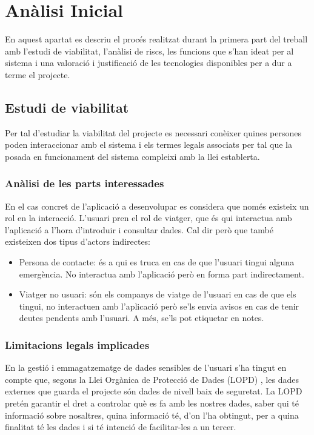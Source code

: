 
\chapter{Anàlisi Inicial} %

\label{AnalisiInicial} %

En aquest apartat es descriu el procés realitzat durant la primera part del treball amb l’estudi de viabilitat, l’anàlisi de riscs, les funcions que s’han ideat per al sistema i una valoració i justificació de les tecnologies disponibles per a dur a terme el projecte.

\section{Estudi de viabilitat}
Per tal d’estudiar la viabilitat del projecte es necessari conèixer quines persones poden interaccionar amb el sistema i els termes legals associats per tal que la posada en funcionament del sistema compleixi amb la llei establerta.

\subsection{Anàlisi de les parts interessades}
En el cas concret de l’aplicació a desenvolupar es considera que només existeix
un rol en la interacció. L’usuari pren el rol de viatger, que és qui interactua
amb l’aplicació a l’hora d’introduir i consultar dades. Cal dir però que també
existeixen dos tipus d’actors indirectes:

\begin{itemize}
\item{}Persona de contacte: és a qui es truca en cas de que l’usuari tingui alguna emergència. No interactua amb l’aplicació però en forma part indirectament.
\item{}Viatger no usuari: són els companys de viatge de l’usuari en cas de que els tingui, no interactuen amb l’aplicació però se’ls envia avisos en cas de tenir deutes pendents amb l’usuari. A més, se’ls pot etiquetar en notes.
\end{itemize}

\subsection{Limitacions legals implicades}
En la gestió i emmagatzematge de dades sensibles de l’usuari s’ha tingut en
compte que, segons la Llei Orgànica de Protecció de Dades (LOPD) , les dades externes que guarda el projecte són dades de nivell baix de seguretat. La LOPD pretén garantir el dret a controlar què es fa amb les nostres dades, saber qui té informació sobre nosaltres, quina informació té, d’on l’ha obtingut, per a quina finalitat té les dades i si té intenció de facilitar-les a un tercer.\\

